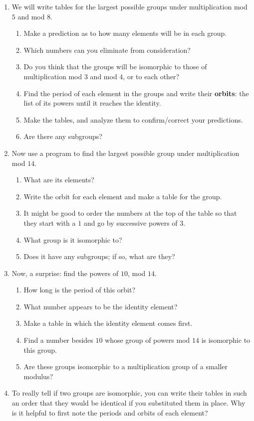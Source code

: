 \documentclass[../gatm.tex]{subfiles}
\begin{document}
\begin{enumerate}
\setcounter{enumi}{\value{problem_i}}
\item We will write tables for the largest possible groups under multiplication mod $5$ and mod $8$.
\begin{enumerate}
\item Make a prediction as to how many elements will be in each group.
\item Which numbers can you eliminate from consideration?
\item Do you think that the groups will be isomorphic to those of multiplication mod $3$ and mod $4$, or to each other?
\item Find the period of each element in the groups and write their \textbf{orbits}: the list of its powers until it reaches the identity.
\item Make the tables, and analyze them to confirm/correct your predictions.
\item Are there any subgroups?
\end{enumerate}
\item Now use a program to find the largest possible group under multiplication mod $14$.
\begin{enumerate}
\item What are its elements?
\item Write the orbit for each element and make a table for the group.
\item It might be good to order the numbers at the top of the table so that they start with a $1$ and go by successive powers of $3$.
\item What group is it isomorphic to?
\item Does it have any subgroups; if so, what are they?
\end{enumerate}
\item Now, a surprise: find the powers of $10$, mod $14$.
\begin{enumerate}
\item How long is the period of this orbit?
\item What number appears to be the identity element?
\item Make a table in which the identity element comes first.
\item Find a number besides $10$ whose group of powers mod $14$ is isomorphic to this group.
\item Are these groups isomorphic to a multiplication group of a smaller modulus?
\end{enumerate}
\item To really tell if two groups are isomorphic, you can write their tables in such an order that they would be identical if you substituted them in place. Why is it helpful to first note the periods and orbits of each element?
\setcounter{problem_i}{\value{enumi}}
\end{enumerate}
\end{document}

